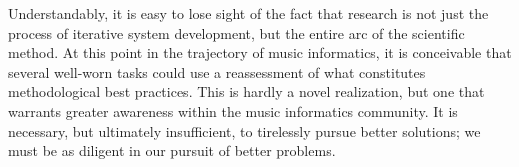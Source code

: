 Understandably, it is easy to lose sight of the fact that research is not just the process of iterative system development, but the entire arc of the scientific method.
At this point in the trajectory of music informatics, it is conceivable that several well-worn tasks could use a reassessment of what constitutes methodological best practices.
This is hardly a novel realization, but one that warrants greater awareness within the music informatics community.
It is necessary, but ultimately insufficient, to tirelessly pursue better solutions;
we must be as diligent in our pursuit of better problems.
